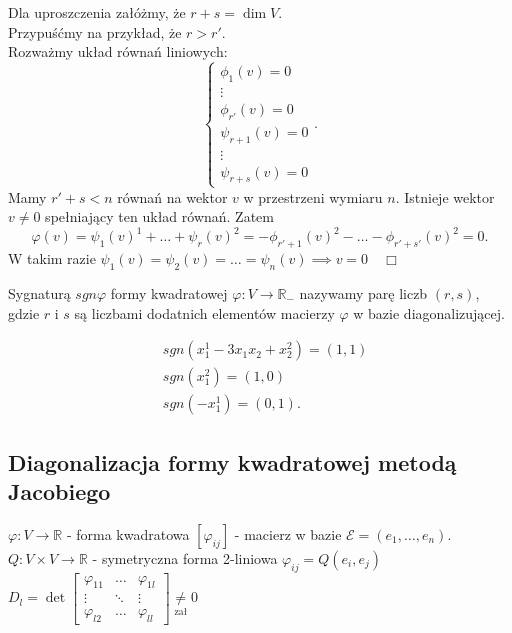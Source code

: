 \documentclass[../main.tex]{subfiles}
\begin{document}
    Dla uproszczenia załóżmy, że $r+s = \dim V$.\\
    Przypuśćmy na przykład, że $r > r'$.\\
    Rozważmy układ równań liniowych:\\
\[
    \begin{cases}
        \phi_1(v) = 0\\
        \vdots\\
        \phi_{r'}(v) = 0\\
        \psi_{r+1}(v) = 0\\
        \vdots\\
        \psi_{r+s}(v) = 0
    \end{cases}
.\]
    Mamy $r'+s < n$ równań na wektor $v$ w przestrzeni wymiaru $n$. Istnieje wektor $v\neq 0$ spełniający ten układ równań. Zatem
    \[
        \varphi(v) = \psi_1(v)^1 + \ldots + \psi_r(v)^2 = -\phi_{r'+1}(v)^2 - \ldots - \phi_{r'+s'}(v)^2 = 0
    .\]
    W takim razie $\psi_1(v) = \psi_2(v) = \ldots = \psi_n(v) \implies v = 0 \quad\Box$

    \begin{definicja}
        Sygnaturą $sgn \varphi$ formy kwadratowej $\varphi: V\to\mathbb{R}_{-}$ nazywamy parę liczb $(r,s)$, gdzie $r$ i $s$ są liczbami dodatnich elementów macierzy $\varphi$ w bazie diagonalizującej.
    \end{definicja}
    \begin{przyklad}

        \begin{align*}
            &sgn (x_1^1 - 3x_1x_2 + x_2^2 ) = (1,1)\\
            &sgn (x_1^2) = (1,0)\\
            &sgn(-x_1^1) = (0,1)
        .\end{align*}

    \end{przyklad}

    \subsection{Diagonalizacja formy kwadratowej metodą Jacobiego}
    $\varphi: V\to\mathbb{R}$ - forma kwadratowa $\left[ \varphi_{ij} \right] $ - macierz w bazie $\mathcal{E} = \left( e_1,\ldots,e_n \right) .$\\
    $Q:V\times V \to\mathbb{R}$ - symetryczna forma 2-liniowa $\varphi_{ij} = Q(e_i,e_j)$ \\
    $D_l = \det \begin{bmatrix} \varphi_{11}&\ldots&\varphi_{1l}\\
    \vdots&\ddots&\vdots\\\varphi_{l2}&\ldots&\varphi_{ll}\end{bmatrix} \underset{\text{zał}}{\neq} 0$
\end{document}

